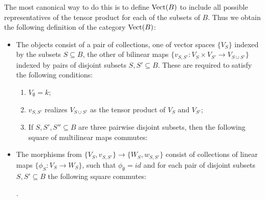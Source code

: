 \documentclass{amsart}
\begin{document}
The most canonical way to do this is to define $\mathrm{Vect}(B)$ to include all possible representatives of the tensor product for each of the subsets of $B$. Thus we obtain the following definition of the category $\mathrm{Vect}(B)$: 
\begin{itemize}
	\item The objects consist of a pair of collections, one of vector spaces $\{ V_S \}$ indexed by the subsets $S \subseteq B$, 
	the other of bilinear maps $ \{ v_{S,S'}: V_S \times V_{S'} \to V_{S \cup S'} \} $ 
	indexed by pairs of disjoint subsets $S, S' \subseteq B$. These are required to satisfy the following conditions:
	\begin{enumerate}
		\item $V_{\emptyset} = k$; 
		\item $v_{S,S'}$ realizes $V_{S \cup S'}$ as the tensor product of $V_S$ and $V_{S'}$;
		\item If $S, S', S'' \subseteq B$ are three pairwise disjoint subsets, then the following square of multilinear maps commutes:
	\begin{center}
	\end{center}
	\end{enumerate} 
	\item The morphisms from $\{ V_S, v_{S, S'} \} \to \{ W_S, w_{S, S'} \}$ consist of collections of linear maps $\{ \phi_S: V_S \to W_S \}$, such that $\phi_{\emptyset} = id$ and for each pair of disjoint subsets $S, S' \subseteq B$ the following square commutes:
	\begin{center}
	.
	\end{center}
\end{itemize}
\end{document}
